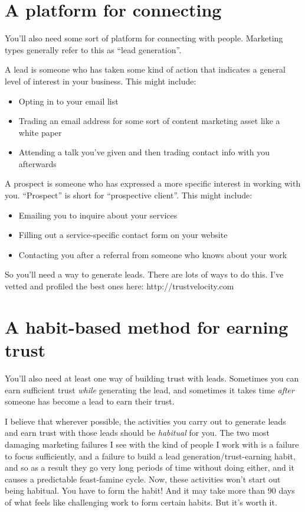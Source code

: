 \section{A platform for connecting}

You'll also need some sort of platform for connecting with people. Marketing types generally refer to this as ``lead generation''.

A lead is someone who has taken some kind of action that indicates a general level of interest in your business. This might include:

\begin{itemize}
\item Opting in to your email list
\item Trading an email address for some sort of content marketing asset like a white paper
\item Attending a talk you've given and then trading contact info with you afterwards
\end{itemize}

A prospect is someone who has expressed a more specific interest in working with you. ``Prospect'' is short for ``prospective client''. This might include:

\begin{itemize}
\item Emailing you to inquire about your services
\item Filling out a service-specific contact form on your website
\item Contacting you after a referral from someone who knows about your work
\end{itemize}

So you'll need a way to generate leads. There are lots of ways to do this. I've vetted and profiled the best ones here: http://trustvelocity.com

\section{A habit-based method for earning trust}

You'll also need at least one way of building trust with leads. Sometimes you can earn sufficient trust \emph{while} generating the lead, and sometimes it takes time \emph{after} someone has become a lead to earn their trust.

I believe that wherever possible, the activities you carry out to generate leads and earn trust with those leads should be \emph{habitual} for you. The two most damaging marketing failures I see with the kind of people I work with is a failure to focus sufficiently, and a failure to build a lead generation/trust-earning habit, and so as a result they go very long periods of time without doing either, and it causes a predictable feast-famine cycle. Now, these activities won't start out being habitual. You have to form the habit! And it may take more than 90 days of what feels like challenging work to form certain habits. But it's worth it.

